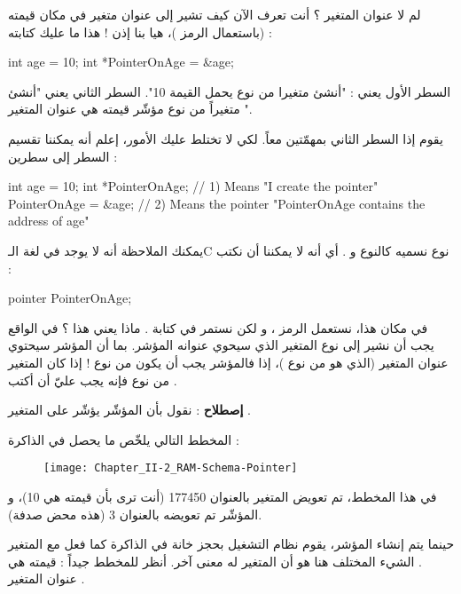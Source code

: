 لم لا عنوان المتغير
؟ أنت تعرف الآن كيف تشير إلى عنوان متغير في مكان قيمته (باستعمال الرمز
\InlineCode{\&})،
هيا بنا إذن ! هذا ما عليك كتابته :

\begin{Csource}
int age = 10;
int *PointerOnAge = &age;
\end{Csource}

السطر الأول يعني : "أنشئ متغيرا من نوع
يحمل القيمة 10". السطر الثاني يعني "أنشئ متغيراً من نوع مؤشّر قيمته هي عنوان المتغير
".

يقوم إذا السطر الثاني بمهمّتين معاً. لكي لا تختلط عليك الأمور، إعلم أنه يمكننا تقسيم السطر إلى سطرين :

\begin{Csource}
int age = 10;
int *PointerOnAge; // 1) Means "I create the pointer"
PointerOnAge = &age; // 2) Means the pointer "PointerOnAge contains the address of age"
\end{Csource}

يمكنك الملاحظة أنه لا يوجد في لغة الـ\textenglish{C}
نوع نسميه
كالنوع
و
.
أي أنه لا يمكننا أن نكتب :

\begin{Csource}
pointer PointerOnAge;
\end{Csource}

في مكان هذا، نستعمل الرمز
\InlineCode{*}
، و لكن نستمر في كتابة
.
ماذا يعني هذا ؟ في الواقع يجب أن نشير إلى نوع المتغير الذي سيحوي عنوانه المؤشر. بما أن المؤشر
سيحتوي عنوان المتغير
(الذي هو من نوع
)،
إذا فالمؤشر يجب أن يكون من نوع
! إذا كان المتغير من نوع
فإنه يجب عليّ أن أكتب
.

\textbf{إصطلاح}
: نقول بأن المؤشّر
يؤشّر على المتغير
.

المخطط التالي يلخّص ما يحصل في الذاكرة :

\begin{figure}[H]
	\centering
	\texttt{[image: Chapter\_II-2\_RAM-Schema-Pointer]}
\end{figure}

في هذا المخطط، تم تعويض المتغير
بالعنوان 177450 (أنت ترى بأن قيمته هي 10)، و المؤشّر
تم تعويضه بالعنوان 3 (هذه محض صدفة).

حينما يتم إنشاء المؤشر، يقوم نظام التشغيل بحجز خانة في الذاكرة كما فعل مع المتغير
.
الشيء المختلف هنا هو أن المتغير
له معنى آخر. أنظر للمخطط جيداً : قيمته هي عنوان المتغير
.

